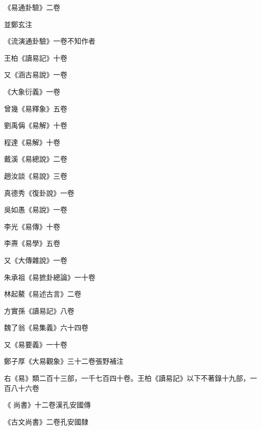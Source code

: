 \begin{pinyinscope}
 《易通卦驗》二卷



 並鄭玄注



 《流演通卦驗》一卷不知作者



 王柏《讀易記》十卷



 又《涵古易說》一卷



 《大象衍義》一卷



 曾幾《易釋象》五卷



 劉禹偁《易解》十卷



 程達《易解》十卷



 戴溪《易總說》二卷



 趙汝談《易說》三卷



 真德秀《復卦說》一卷



 吳如愚《易說》一卷



 李光《易傳》十卷



 李燾《易學》五卷



 又《大傳雜說》一卷



 朱承祖《易摭卦總論》一十卷



 林起鰲《易述古言》二卷



 方實孫《讀易記》八卷



 魏了翁《易集義》六十四卷



 又《易要義》一十卷



 鄭子厚《大易觀象》三十二卷張野補注



 右《易》類二百十三部，一千七百四十卷。王柏《讀易記》以下不著錄十九部，一百八十六卷



 《
 尚書》十二卷漢孔安國傳



 《古文尚書》二卷孔安國隸




\end{pinyinscope}
